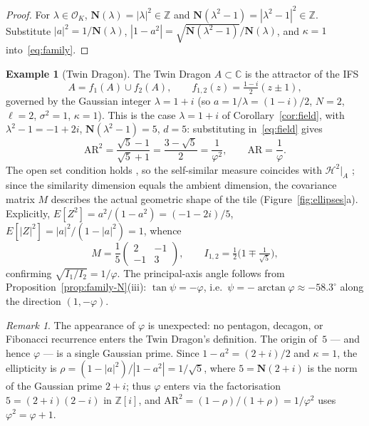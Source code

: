 \documentclass{amsart}
\theoremstyle{definition}
\newtheorem{example}[theorem]{Example}
\theoremstyle{remark}
\newtheorem{remark}[theorem]{Remark}
\begin{document}
\begin{proof}
For $\lambda\in\mathcal{O}_K$,
$\mathbf{N}(\lambda)=|\lambda|^2\in\mathbb{Z}$
and $\mathbf{N}(\lambda^2-1)=|\lambda^2-1|^2\in\mathbb{Z}$.
Substitute $|a|^2 = 1/\mathbf{N}(\lambda)$,
$|1-a^2| = \sqrt{\mathbf{N}(\lambda^2-1)}/\mathbf{N}(\lambda)$,
and $\kappa=1$
into~\eqref{eq:family}.
\end{proof}

\begin{example}[Twin Dragon]\label{ex:twin-dragon}
The Twin Dragon $A\subset\mathbb{C}$ is the attractor of the IFS
\cite{DavisKnuth1970}
\[
  A = f_1(A)\cup f_2(A),\qquad
  f_{1,2}(z) = \tfrac{1-i}{2}(z\pm 1),
\]
governed by the Gaussian integer $\lambda=1+i$
\textup{(}so $a=1/\lambda=(1-i)/2$, $N=2$, $\ell=2$,
$\sigma^2=1$, $\kappa=1$\textup{)}.
This is the case $\lambda=1+i$ of Corollary~\ref{cor:field},
with $\lambda^2-1 = -1+2i$, $\mathbf{N}(\lambda^2-1)=5$, $d=5$:
substituting in~\eqref{eq:field} gives
\[
  \mathrm{AR}^2
  = \frac{\sqrt{5}-1}{\sqrt{5}+1}
  = \frac{3-\sqrt{5}}{2}
  = \frac{1}{\varphi^2},
  \qquad
  \mathrm{AR} = \frac{1}{\varphi}.
\]
The open set condition holds \cite[Corollary~3]{Bandt1991}, so the
self-similar measure coincides with $\mathcal{H}^2|_A$
\cite[\S5]{Hutchinson1981}; since the similarity dimension equals the
ambient dimension, the covariance matrix $M$ describes the actual
geometric shape of the tile \textup{(}Figure~\ref{fig:ellipses}a\textup{)}.
Explicitly, $E[Z^2]=a^2/(1-a^2)=(-1-2i)/5$,
$E[|Z|^2]=|a|^2/(1-|a|^2)=1$, whence
\[
  M = \frac{1}{5}\begin{pmatrix}2 & -1 \\ -1 & 3\end{pmatrix},
  \qquad
  I_{1,2} = \tfrac{1}{2}\bigl(1\mp\tfrac{1}{\sqrt{5}}\bigr),
\]
confirming $\sqrt{I_1/I_2}=1/\varphi$.
The principal-axis angle follows from
Proposition~\ref{prop:family-N}\textup{(}iii\textup{)}:
$\tan\psi=-\varphi$, i.e.\ $\psi=-\arctan\varphi\approx-58.3^\circ$
along the direction $(1,-\varphi)$.
\end{example}

\begin{remark}
The appearance of $\varphi$ is unexpected: no pentagon, decagon, or
Fibonacci recurrence enters the Twin Dragon's definition.
The origin of~$5$ --- and hence $\varphi$ --- is a single Gaussian
prime.  Since $1-a^2=(2+i)/2$ and $\kappa=1$, the ellipticity is
$\rho = (1-|a|^2)/|1-a^2| = 1/\sqrt{5}$, where $5=\mathbf{N}(2+i)$
is the norm of the Gaussian prime $2+i$;
thus $\varphi$ enters via the factorisation $5=(2+i)(2-i)$ in
$\mathbb{Z}[i]$, and $\mathrm{AR}^2=(1-\rho)/(1+\rho)=1/\varphi^2$
uses $\varphi^2=\varphi+1$.
\end{remark}
\end{document}
